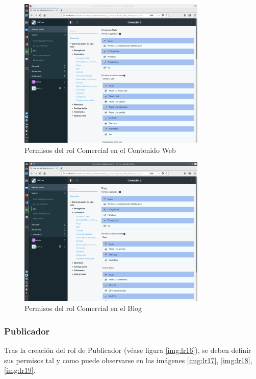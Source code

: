 \begin{figure}[H]
\begin{center}
\includegraphics[width=0.8\textwidth]{./img/liferay/14.png}
\end{center}
\caption{Permisos del rol Comercial en el Contenido Web}
\label{img:lr14}
\end{figure}

\begin{figure}[H]
\begin{center}
\includegraphics[width=0.8\textwidth]{./img/liferay/15.png}
\end{center}
\caption{Permisos del rol Comercial en el Blog}
\label{img:lr15}
\end{figure}

\subsubsection{Publicador}
\par Tras la creación del rol de Publicador (véase figura \ref{img:lr16}), se deben definir sus permisos tal y como puede observarse en las imágenes \ref{img:lr17}, \ref{img:lr18}, \ref{img:lr19}.

